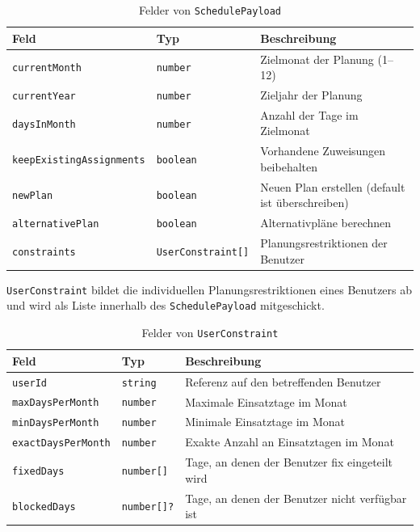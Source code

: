 \begin{table}[H]
	\centering
	\caption{Felder von \texttt{SchedulePayload}}\label{tab:schedule-payload}
	\begin{tabularx}{\linewidth}{l l >{\raggedright\arraybackslash}X}
		\toprule
		\textbf{Feld} & \textbf{Typ} & \textbf{Beschreibung} \\
		\midrule
		\texttt{currentMonth}              & \texttt{number}            & Zielmonat der Planung (1--12) \\
		\texttt{currentYear}               & \texttt{number}            & Zieljahr der Planung \\
		\texttt{daysInMonth}               & \texttt{number}            & Anzahl der Tage im Zielmonat \\
		\texttt{keepExistingAssignments}   & \texttt{boolean}           & Vorhandene Zuweisungen beibehalten \\
		\texttt{newPlan}                   & \texttt{boolean}           & Neuen Plan erstellen (default ist überschreiben) \\
		\texttt{alternativePlan}           & \texttt{boolean}           & Alternativpläne berechnen \\
		\texttt{constraints}               & \texttt{UserConstraint[]}  & Planungsrestriktionen der Benutzer \\
		\bottomrule
	\end{tabularx}
\end{table}
\texttt{UserConstraint} 
bildet die individuellen Planungsrestriktionen eines Benutzers ab und wird als Liste 
innerhalb des \texttt{SchedulePayload} mitgeschickt.

\begin{table}[H]
	\centering
	\caption{Felder von \texttt{UserConstraint}}\label{tab:user-constraint}
	\begin{tabularx}{\linewidth}{l l >{\raggedright\arraybackslash}X}
		\toprule
		\textbf{Feld} & \textbf{Typ} & \textbf{Beschreibung} \\
		\midrule
		\texttt{userId}              & \texttt{string}          & Referenz auf den betreffenden Benutzer \\
		\texttt{maxDaysPerMonth}     & \texttt{number}         & Maximale Einsatztage im Monat \\
		\texttt{minDaysPerMonth}     & \texttt{number}         & Minimale Einsatztage im Monat \\
		\texttt{exactDaysPerMonth}   & \texttt{number}         & Exakte Anzahl an Einsatztagen im Monat \\
		\texttt{fixedDays}           & \texttt{number[]}       & Tage, an denen der Benutzer fix eingeteilt wird \\
		\texttt{blockedDays}         & \texttt{number[]?}       & Tage, an denen der Benutzer nicht verfügbar ist \\
		\bottomrule
	\end{tabularx}
\end{table}

